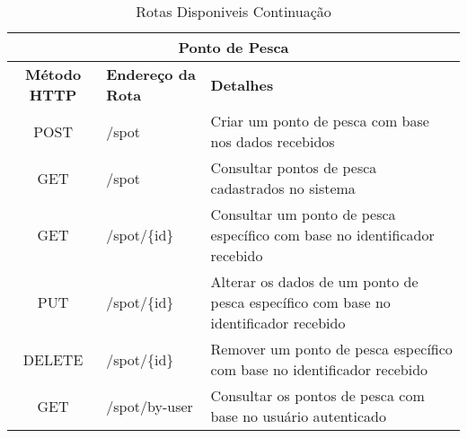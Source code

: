 \begin{table}[h!]
    \centering
    \caption[Rotas Disponiveis Continuação]{Rotas Disponiveis Continuação
    \label{tab:tb-api-fishspot-others}}
    \setlength{\extrarowheight}{4pt}
    \begin{tabular}{|c|l|p{}|} 

        \hline
        \multicolumn{3}{|c|}{\textbf{Ponto de Pesca}} \\
        \hline
        \textbf{Método HTTP} & \textbf{Endereço da Rota} & \textbf{Detalhes} \\
        \hline
        POST & /spot & Criar um ponto de pesca com base nos dados recebidos \\
        \hline
        GET & /spot & Consultar pontos de pesca cadastrados no sistema \\
        \hline
        GET & /spot/\{id\} & Consultar um ponto de pesca específico com base no identificador recebido \\
        \hline
        PUT & /spot/\{id\} & Alterar os dados de um ponto de pesca específico com base no identificador recebido \\
        \hline
        DELETE & /spot/\{id\} & Remover um ponto de pesca específico com base no identificador recebido \\
        \hline
        GET & /spot/by-user & Consultar os pontos de pesca com base no usuário autenticado \\
        \hline
        
    \end{tabular}
\end{table}